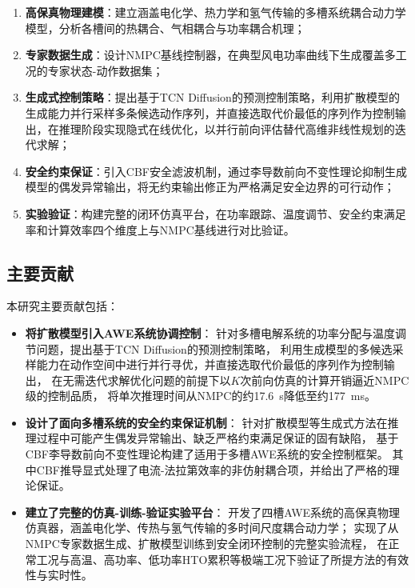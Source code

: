 \begin{enumerate}
  \item \textbf{高保真物理建模}：建立涵盖电化学、热力学和氢气传输的多槽系统耦合动力学模型，分析各槽间的热耦合、气相耦合与功率耦合机理；

  \item \textbf{专家数据生成}：设计NMPC基线控制器，在典型风电功率曲线下生成覆盖多工况的专家状态-动作数据集；

  \item \textbf{生成式控制策略}：提出基于TCN Diffusion的预测控制策略，利用扩散模型的生成能力并行采样多条候选动作序列，并直接选取代价最低的序列作为控制输出，在推理阶段实现隐式在线优化，以并行前向评估替代高维非线性规划的迭代求解；

  \item \textbf{安全约束保证}：引入CBF安全滤波机制，通过李导数前向不变性理论抑制生成模型的偶发异常输出，将无约束输出修正为严格满足安全边界的可行动作；

  \item \textbf{实验验证}：构建完整的闭环仿真平台，在功率跟踪、温度调节、安全约束满足率和计算效率四个维度上与NMPC基线进行对比验证。
\end{enumerate}

\subsection{主要贡献}

本研究主要贡献包括：

\begin{itemize}
  \item \textbf{将扩散模型引入AWE系统协调控制}：
  针对多槽电解系统的功率分配与温度调节问题，提出基于TCN Diffusion的预测控制策略，
  利用生成模型的多候选采样能力在动作空间中进行并行寻优，并直接选取代价最低的序列作为控制输出，
  在无需迭代求解优化问题的前提下以$K$次前向仿真的计算开销逼近NMPC级的控制品质，
  将单次推理时间从NMPC的约17.6~s降低至约177~ms。

  \item \textbf{设计了面向多槽系统的安全约束保证机制}：
  针对扩散模型等生成式方法在推理过程中可能产生偶发异常输出、缺乏严格约束满足保证的固有缺陷，
  基于CBF李导数前向不变性理论构建了适用于多槽AWE系统的安全控制框架。
  其中CBF推导显式处理了电流-法拉第效率的非仿射耦合项，并给出了严格的理论保证。

  \item \textbf{建立了完整的仿真-训练-验证实验平台}：
  开发了四槽AWE系统的高保真物理仿真器，涵盖电化学、传热与氢气传输的多时间尺度耦合动力学；
  实现了从NMPC专家数据生成、扩散模型训练到安全闭环控制的完整实验流程，
  在正常工况与高温、高功率、低功率HTO累积等极端工况下验证了所提方法的有效性与实时性。
\end{itemize}

